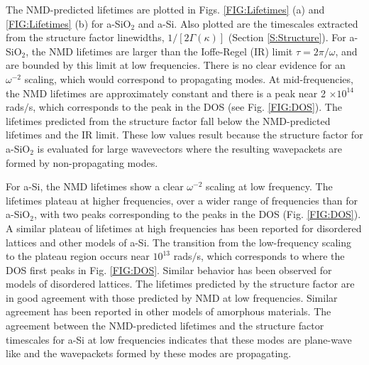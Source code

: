 \documentclass[aps,prb,onecolumn,preprint,superscriptaddress,footinbib,amsmath,amssymb,floatfix]{revtex4}
\begin{document}
The NMD-predicted lifetimes are plotted in Figs. \ref{FIG:Lifetimes} 
(a) and \ref{FIG:Lifetimes} (b) 
for a-SiO$_2$ and a-Si. 
Also plotted are the timescales extracted from the structure 
factor linewidths, $1/[2\Gamma(\kappa)]$ (Section \ref{S:Structure}). 
For a-SiO$_2$, the NMD lifetimes are larger than 
the Ioffe-Regel (IR) limit $\tau = 2\pi/\omega$,
\cite{taraskin_determination_1999} and are bounded by  
this limit at low frequencies. There is no clear evidence for an 
$\omega^{-2}$ scaling, which would correspond to propagating modes.  
At mid-frequencies, the NMD lifetimes are approximately constant and  
there is a peak near 2 $\times 10^{14}$ rads$/$s, which corresponds to 
the peak in the DOS (see Fig. \ref{FIG:DOS}). 
The lifetimes predicted from the 
structure factor fall below the NMD-predicted lifetimes 
and the IR limit. These low values result because the structure factor 
for a-SiO$_2$ is evaluated for large wavevectors where the resulting 
wavepackets are formed by non-propagating modes.
\cite{feldman_thermal_1993,feldman_numerical_1999,allen_diffusons_1999}

For a-Si, the NMD lifetimes show a clear $\omega^{-2}$ 
scaling at low frequency. 
The lifetimes plateau at higher frequencies,
over a wider range of frequencies than for a-SiO$_2$, with two peaks 
corresponding to the peaks in the DOS (Fig. \ref{FIG:DOS}). A similar 
plateau of lifetimes at high frequencies has been 
reported for disordered lattices
\cite{sheng_heat_1991,he_lattice_2012,larkin_predicting_2013} and 
other models of a-Si.\cite{he_heat_2011} 
The transition from the low-frequency scaling to 
the plateau region occurs near 
$10^{13}$ rads$/$s, which corresponds to where the DOS first peaks 
in Fig. \ref{FIG:DOS}. 
Similar behavior has been observed for models of disordered lattices.
\cite{larkin_predicting_2013} The lifetimes predicted by the 
structure factor are in good agreement with those predicted by NMD 
at low frequencies. Similar agreement has been reported in other 
models of amorphous materials.
\cite{mazzacurati_low-frequency_1996,bickham_calculation_1998,
bickham_numerical_1999,feldman_numerical_1999} 
The agreement between the 
NMD-predicted lifetimes and the structure factor timescales for a-Si 
at low frequencies indicates that these modes are plane-wave like 
and the wavepackets formed by these modes are propagating.
\cite{feldman_thermal_1993,feldman_numerical_1999,allen_diffusons_1999}
\end{document}
